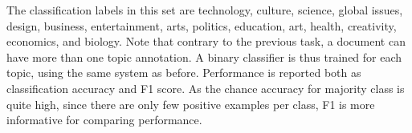 The classification labels in this set are technology, culture, science, global issues, design, business, entertainment, arts, politics, education, art, health, creativity, economics, and biology. Note that contrary to the previous task, a document can have more than one topic annotation. A binary classifier is thus trained for each topic, using the same system as before. Performance is reported both as classification accuracy and F1 score. As the chance accuracy for majority class is quite high, since there are only few positive examples per class, F1 is more informative for comparing performance.








